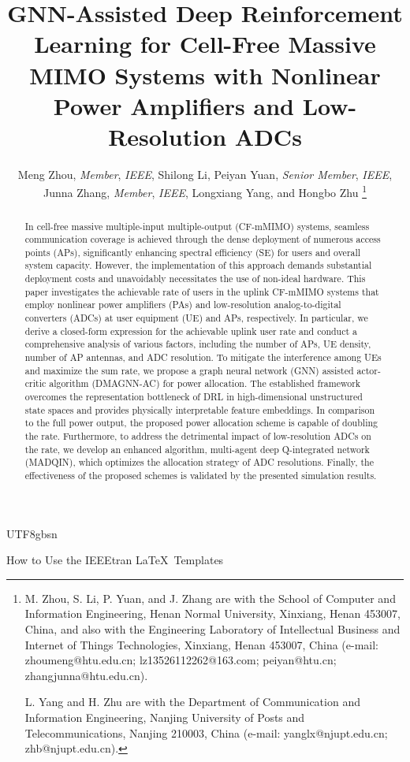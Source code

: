 \documentclass[lettersize,journal]{IEEEtran}
\begin{document}
\begin{CJK}{UTF8}{gbsn}
\title{GNN-Assisted Deep Reinforcement Learning for Cell-Free Massive MIMO Systems with Nonlinear Power Amplifiers and Low-Resolution ADCs}
\author{Meng Zhou, \textit{Member}, \textit{IEEE}, Shilong Li, Peiyan Yuan, \textit{Senior Member}, \textit{IEEE}, Junna Zhang, \textit{Member}, \textit{IEEE}, Longxiang Yang, and Hongbo Zhu
\thanks{M. Zhou, S. Li, P. Yuan, and J. Zhang are with the School of Computer and Information Engineering, Henan Normal University, Xinxiang, Henan 453007, China, and also with the Engineering Laboratory of Intellectual Business and Internet of Things Technologies, Xinxiang, Henan 453007, China (e-mail: zhoumeng@htu.edu.cn; lz13526112262@163.com; peiyan@htu.cn; zhangjunna@htu.edu.cn).

L. Yang and H. Zhu are with the Department of Communication and Information Engineering, Nanjing University of Posts and Telecommunications, Nanjing 210003, China (e-mail: yanglx@njupt.edu.cn; zhb@njupt.edu.cn).
}}
%
{How to Use the IEEEtran \LaTeX \ Templates}

\maketitle

\begin{abstract}
In cell-free massive multiple-input multiple-output (CF-mMIMO) systems, seamless communication coverage is achieved through the dense deployment of numerous access points (APs), significantly enhancing spectral efficiency (SE) for users and overall system capacity. However, the implementation of this approach demands substantial deployment costs and unavoidably necessitates the use of non-ideal hardware. This paper investigates the achievable rate of users in the uplink CF-mMIMO systems that employ nonlinear power amplifiers (PAs) and low-resolution analog-to-digital converters (ADCs) at user equipment (UE) and APs, respectively. In particular, we derive a closed-form expression for the achievable uplink user rate and conduct a comprehensive analysis of various factors, including the number of APs, UE density, number of AP antennas, and ADC resolution. To mitigate the interference among UEs and maximize the sum rate, we propose a graph neural network (GNN) assisted actor-critic algorithm (DMAGNN-AC) for power allocation. The established framework overcomes the representation bottleneck of DRL in high-dimensional unstructured state spaces and provides physically interpretable feature embeddings. In comparison to the full power output, the proposed power allocation scheme is capable of doubling the rate. Furthermore, to address the detrimental impact of low-resolution ADCs on the rate, we develop an enhanced algorithm, multi-agent deep Q-integrated network (MADQIN), which optimizes the allocation strategy of ADC resolutions. Finally, the effectiveness of the proposed schemes is validated by the presented simulation results.
\end{abstract}


\end{CJK}
\end{document}
